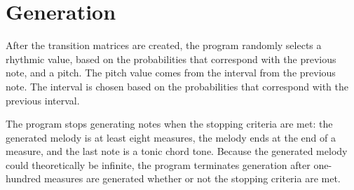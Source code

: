 \section{Generation} \label{markov:generation}

After the transition matrices are created, the program randomly selects a rhythmic value, based on the probabilities that correspond with the previous note, and a pitch.
The pitch value comes from the interval from the previous note.
The interval is chosen based on the probabilities that correspond with the previous interval.

The program stops generating notes when the stopping criteria are met: the generated melody is at least eight measures, the melody ends at the end of a measure, and the last note is a tonic chord tone.
Because the generated melody could theoretically be infinite, the program terminates generation after one-hundred measures are generated whether or not the stopping criteria are met.

